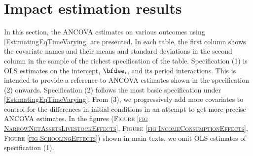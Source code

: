 


\section{Impact estimation results}
\label{AppendixEstimationTables}
\setcounter{table}{0}

	In this section, the ANCOVA estimates on various outcomes using %
	\eqref{EstimatingEqTimeVarying} are presented. In each table, the first column shows the covariate names and their means and standard deviations in the second column in the sample of the richest specification of the table. Specification (1) is OLS estimates on the intercept, $\bfdee_{i}$, and its period interactions. This is intended to provide a reference to ANCOVA estimates shown in the specification (2) onwards. Specification (2) follows the most basic specification under \eqref{EstimatingEqTimeVarying}. From (3), we progressively add more covariates to control for the differences in initial conditions in an attempt to get more precise ANCOVA estimates. In the figures (\textsc{\footnotesize Figure \ref{fig NarrowNetAssetsLivestockEffects}}, \textsc{\small Figure \ref{fig IncomeConsumptionEffects}}, \textsc{\footnotesize Figure \ref{fig SchoolingEffects}}) shown in main texts, we omit OLS estimates of specification (1). 
	
